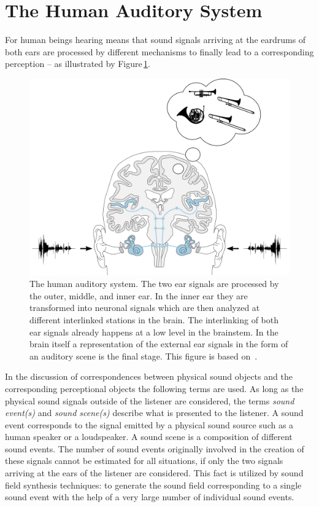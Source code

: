 \section{The Human Auditory System}
\label{sec:hearing_of_the_human_auditory_system}
%
For human beings hearing means that sound signals arriving
at the eardrums of both ears are processed by different mechanisms to finally
lead to a corresponding perception -- as illustrated by
Figure\,\ref{fig:auditory_scene}.
%
\begin{figure}
    \small
    \centering
    \includegraphics[width=0.8\columnwidth]{fig1_01/auditory_scene}
    \caption{The human auditory system. The two ear signals are processed by the
    outer, middle, and inner ear. In the inner ear they are transformed into
    neuronal signals which are then analyzed at different interlinked stations
    in the brain. The interlinking of both ear signals already happens
    at a low level in the brainstem. In the brain itself a representation of
    the external ear signals in the form of an auditory scene is the final stage.
    This figure is based on~\cite{Grothe2010,Talbot2011a,Chittka2005}.
    }
    \label{fig:auditory_scene}
\end{figure}

In the discussion of correspondences
between physical sound objects and the corresponding perceptional
objects the following terms are used. As long as the physical
sound signals outside of the listener are considered, the terms
\emph{sound event(s)} and \emph{sound scene(s)} describe what is presented to
the listener. A sound event corresponds to the signal emitted by
a physical sound source such as a
human speaker or a loudspeaker. A sound scene is a composition of different
sound events.
The number of sound events originally involved in the creation of these
signals cannot be estimated for all situations, if only the two signals arriving
at the ears of the listener are considered.
This fact
is utilized by sound field synthesis techniques: to generate the sound field
corresponding to a single sound event with the help of a very large number of
individual sound
events.

